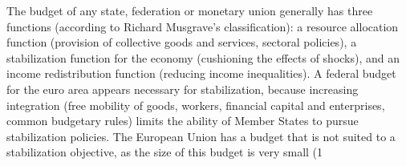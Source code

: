 \documentclass[12pt]{article}
\begin{document}
The budget of any state, federation or monetary union generally has three functions (according to Richard Musgrave's classification): a resource allocation function (provision of collective goods and services, sectoral policies), a stabilization function for the economy (cushioning the effects of shocks), and an income redistribution function (reducing income inequalities). A federal budget for the euro area appears necessary for stabilization, because increasing integration (free mobility of goods, workers, financial capital and enterprises, common budgetary rules) limits the ability of Member States to pursue stabilization policies. The European Union has a budget that is not suited to a stabilization objective, as the size of this budget is very small (1%
\end{document}
